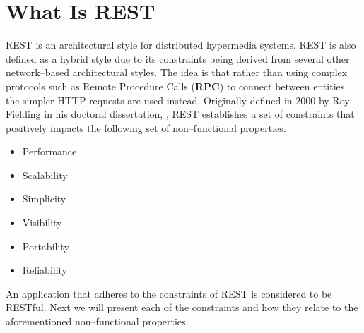 \section{What Is REST}
REST is an architectural style for distributed hypermedia systems.
REST is also defined as a hybrid style due to its constraints being derived from several other network--based architectural styles.
The idea is that rather than using complex protocols such as Remote Procedure Calls (\textbf{RPC}) to connect between entities, the simpler HTTP requests are used instead.
Originally defined in 2000 by Roy Fielding in his doctoral dissertation, \citep{fielding2000rest}, REST establishes a set of constraints that positively impacts the following set of non--functional properties.

\begin{multicols}{3}
\begin{itemize}
    \item Performance
    \item Scalability
    \item Simplicity
    \item Visibility
    \item Portability
    \item Reliability
\end{itemize}
\end{multicols}
An application that adheres to the constraints of REST is considered to be RESTful.
Next we will present each of the constraints and how they relate to the aforementioned non--functional properties.


